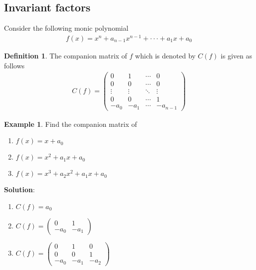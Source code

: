 \documentclass{article}
\theoremstyle{definition}
\newtheorem{defn}[thm]{Definition}
\newtheorem{exmp}[thm]{Example}
\theoremstyle{remark}
\begin{document}
\subsection{Invariant factors}
Consider the following monic polynomial
\begin{align}
f(x)=x^n+a_{n-1}x^{n-1}+\cdot\cdot\cdot+a_1x+a_0
\end{align}
\begin{defn}
The companion matrix of $f$ which is denoted by $C(f)$ is given as follows
\begin{align}
  C(f)= \left(
    \begin{matrix}
      0 & 1 &   \cdots & 0 \\
      0 & 0 &   \cdots & 0 \\
      \vdots & \vdots &   \ddots & \vdots \\
      0 & 0 &   \cdots & 1 \\
      -a_0 & -a_1 & \cdots & -a_{n-1}
    \end{matrix}
    \right)
\end{align}
\end{defn}

\begin{exmp}
Find the companion matrix of
\begin{enumerate}
  \item $f(x)=x+a_0$
  \item $f(x)=x^2+a_1x+a_0$
  \item $f(x)=x^3+a_2x^2+a_1x+a_0$
\end{enumerate}
\textbf{Solution}:
\begin{enumerate}
  \item $C(f)=a_0$
  \item $C(f)=\left(
    \begin{matrix}
      0 & 1  \\
      -a_0 & -a_1
    \end{matrix}
    \right)$
  \item $C(f)=\left(
    \begin{matrix}
      0 & 1 & 0 \\
      0 & 0 & 1 \\
      -a_0 & -a_1 & -a_2
    \end{matrix}
    \right)$
\end{enumerate}
\end{exmp}
\end{document}
